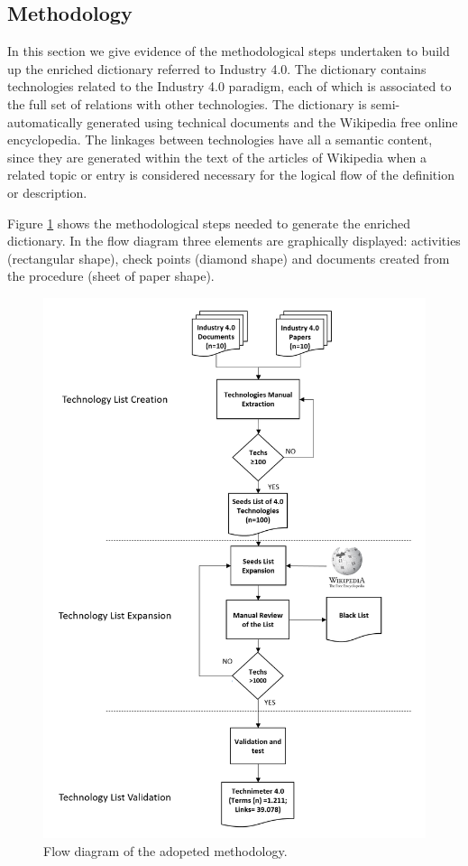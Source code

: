 \documentclass[]{book}
\begin{document}
\subsection{Methodology}\label{methodology-6}

In this section we give evidence of the methodological steps undertaken
to build up the enriched dictionary referred to Industry 4.0. The
dictionary contains technologies related to the Industry 4.0 paradigm,
each of which is associated to the full set of relations with other
technologies. The dictionary is semi-automatically generated using
technical documents and the Wikipedia free online encyclopedia. The
linkages between technologies have all a semantic content, since they
are generated within the text of the articles of Wikipedia when a
related topic or entry is considered necessary for the logical flow of
the definition or description.

Figure \ref{fig:wf40} shows the methodological steps needed to generate
the enriched dictionary. In the flow diagram three elements are
graphically displayed: activities (rectangular shape), check points
(diamond shape) and documents created from the procedure (sheet of paper
shape).

\begin{figure}

{\centering \includegraphics[width=0.8\linewidth]{_bookdown_files/figures/technimeter_03} 

}

\caption{Flow diagram of the adopeted methodology.}\label{fig:wf40}
\end{figure}
\end{document}
